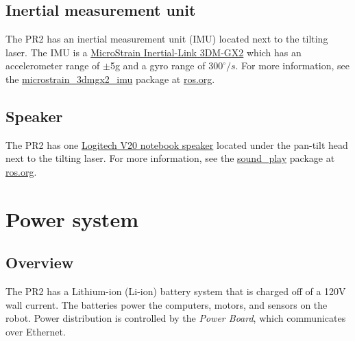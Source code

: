 \subsection{Inertial measurement unit}
The PR2 has an inertial measurement unit (IMU) located next to the tilting laser. The IMU is a 
\href{http://www.microstrain.com/3dm-gx2.aspx}{MicroStrain Inertial-Link 3DM-GX2} which has an 
accelerometer range of $\pm$5g and a gyro range of $300^\circ/s$. For more information, see 
the \href{http://www.ros.org/wiki/microstrain_3dmgx2_imu}{microstrain\_3dmgx2\_imu} package 
at \href{http://www.ros.org}{ros.org}.

\subsection{Speaker}
The PR2 has one \href{http://www.logitech.com/index.cfm/speakers_audio/home_pc_speakers/devices/199&cl=us,en}{Logitech V20 notebook speaker} 
located under the pan-tilt head next to the tilting laser. For more information, 
see the \href{http://www.ros.org/wiki/sound_play}{sound\_play} package at \href{http://www.ros.org}{ros.org}.

\section{Power system}
\subsection{Overview}
The PR2 has a Lithium-ion (Li-ion) battery system that is charged off of a 120V wall current. The batteries power the computers, motors, and sensors on the robot.  Power distribution is controlled by the \emph{Power Board}, which communicates over Ethernet.
